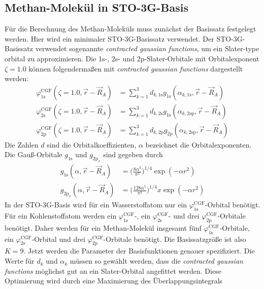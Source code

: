 \documentclass[9pt]{report}
\begin{document}
\subsection{Methan-Molekül in STO-3G-Basis}
Für die Berechnung des Methan-Moleküls muss zunächst der Basissatz festgelegt werden. Hier wird ein minimaler STO-3G-Basissatz verwendet. Der STO-3G-Basissatz verwendet sogenannte \textit{contracted gaussian functions}, um ein Slater-type orbital zu approximieren. Die 1s-, 2s- und 2p-Slater-Orbitale mit Orbitalexponent $\zeta=1.0$ können folgendermaßen mit \textit{contracted gaussian functions} dargestellt werden:
\begin{align}
\varphi_{1\mathrm{s}}^{\mathrm{CGF}}(\zeta=1.0,\vec{r}-\vec{R}_{A}) &= \sum_{k=1}^{3}d_{k,1\mathrm{s}}g_{1\mathrm{s}}(\alpha_{k,1\mathrm{s}},\vec{r}-\vec{R}_{A})\\
\varphi_{2\mathrm{s}}^{\mathrm{CGF}}(\zeta=1.0,\vec{r}-\vec{R}_{A}) &= \sum_{k=1}^{3}d_{k,2\mathrm{s}}g_{1\mathrm{s}}(\alpha_{k,2\mathrm{sp}},\vec{r}-\vec{R}_{A})\\
\varphi_{2\mathrm{p}}^{\mathrm{CGF}}(\zeta=1.0,\vec{r}-\vec{R}_{A}) &= \sum_{k=1}^{3}d_{k,2\mathrm{p}}g_{2\mathrm{p}}(\alpha_{k,2\mathrm{sp}},\vec{r}-\vec{R}_{A})
\end{align}
Die Zahlen $d$ sind die Orbitalkoeffizienten, $\alpha$ bezeichnet die Orbitalexponenten. Die Gauß-Orbitale $g_{1\mathrm{s}}$ und $g_{2\mathrm{p}_x}$ sind gegeben durch
\begin{align}
g_{1\mathrm{s}}(\alpha,\vec{r}-\vec{R}_A)&=\Big(\frac{8\alpha^3}{\pi^3}\Big)^{1/4}\exp(-\alpha r^2)\\
g_{2\mathrm{p}_x}(\alpha,\vec{r}-\vec{R}_A)&=\Big(\frac{128\alpha^5}{\pi^3}\Big)^{1/4}x\exp(-\alpha r^2)
\end{align}
In der STO-3G-Basis wird für ein Wasserstoffatom nur ein $\varphi_{1\mathrm{s}}^{\mathrm{CGF}}$-Orbital benötigt. Für ein Kohlenstoffatom werden ein $\varphi_{1\mathrm{s}}^{\mathrm{CGF}}$-, ein $\varphi_{2\mathrm{s}}^{\mathrm{CGF}}$- und drei $\varphi_{2\mathrm{p}}^{\mathrm{CGF}}$-Orbitale benötigt. Daher werden für ein Methan-Molekül insgesamt fünf $\varphi_{1\mathrm{s}}^{\mathrm{CGF}}$-Orbitale, ein $\varphi_{2\mathrm{s}}^{\mathrm{CGF}}$-Orbital und drei $\varphi_{2\mathrm{p}}^{\mathrm{CGF}}$-Orbitale benötigt. Die Basissatzgröße ist also $K=9$. Jetzt werden die Parameter der Basisfunktionen genauer spezifiziert. Die Werte für $d_{k}$ und $\alpha_k$ müssen so gewählt werden, dass die \textit{contracted gaussian functions} möglichst gut an ein Slater-Orbital angefittet werden. Diese Optimierung wird durch eine Maximierung des Überlappungsintegrals
\end{document}
